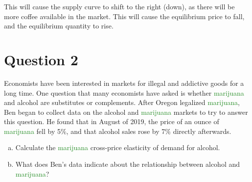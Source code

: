 \documentclass{article}
\newcommand{\question}[1]{\pagebreak\section{Question #1}}
\begin{document}
\begin{enumerate}[(a)]
    This will cause the supply curve to shift to the right (down), as there will be more coffee available in the market. This will cause the equilibrium price to fall, and the equilibrium quantity to rise.

\end{enumerate}

\pagebreak

\question{2}

Economists have been interested in markets for illegal and addictive goods for a long time. One question that many economists have asked is whether \textcolor{ForestGreen}{marijuana} and alcohol are substitutes or complements. After Oregon legalized \textcolor{ForestGreen}{marijuana}, Ben began to collect data on the alcohol and \textcolor{ForestGreen}{marijuana} markets to try to answer this question. He found that in August of 2019, the price of an ounce of \textcolor{ForestGreen}{marijuana} fell by 5\%, and that alcohol sales rose by 7\% directly afterwards.

\begin{enumerate}[(a)]
    \item Calculate the \textcolor{ForestGreen}{marijuana} cross-price elasticity of demand for alcohol.
    \item What does Ben's data indicate about the relationship between alcohol and \textcolor{ForestGreen}{marijuana}?
\end{enumerate}
\end{document}

